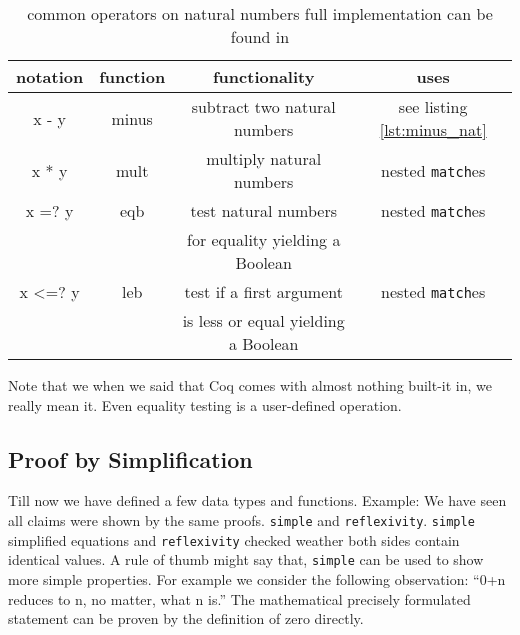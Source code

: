 	   \begin{table}   
	   \begin{tabular}{|c|c|c|c|}
	     \hline 
	 	  notation      & function        & functionality                       & uses           \\  \hline
	 	  x - y         & minus           & subtract two natural numbers        & see listing  \ref{lst:minus_nat} \\  \hline
	      x * y         & mult            & multiply natural numbers            & nested \lstinline!match!es \\  \hline   
	   	  x =? y        & eqb             & test natural numbers                & nested \lstinline!match!es \\  
	  	                &                 & for equality yielding a Boolean     &                \\  \hline
	   	  x <=? y       & leb             & test if a first argument            & nested \lstinline!match!es \\  
	   	                &                 & is less or equal yielding a Boolean &                \\  \hline
	   \end{tabular}
	   \caption{\label{tab:operators} common operators on natural numbers full implementation can be found in \cite[section: Basics Functional Programming in Coq: Numbers]{PACGGHSY}}
	   \end{table}   
	   
		Note that we when we said that Coq comes with almost nothing built-it in, we really mean it.
	    Even equality testing is a user-defined operation.
	    
	   \subsection{Proof by Simplification}
	   
	   Till now we have defined a few data types and functions.
	   Example: We have seen all claims were shown by the same proofs. \lstinline!simple! and \lstinline!reflexivity!. 
	   \lstinline!simple! simplified equations and \lstinline!reflexivity! checked weather both sides contain identical values.
	   A rule of thumb might say that, \lstinline!simple! can be used to show more simple properties.
	   For example we consider the following observation: ``0+n reduces to n, no matter, what n is.''
	   The mathematical precisely formulated statement can be proven by the definition of zero directly.
	   
